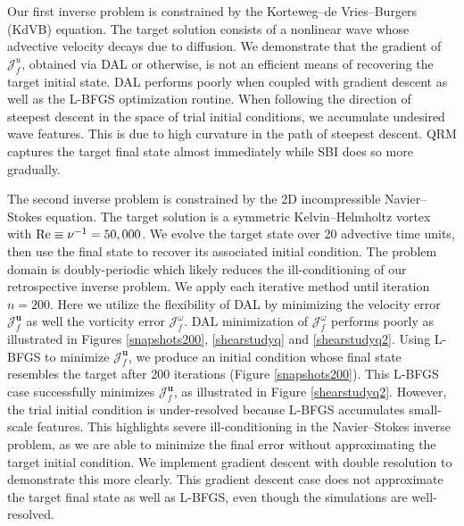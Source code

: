 \documentclass[%
 reprint,
 amsmath,amssymb,
 aps,
 pre,
]{revtex4-2}
\renewcommand{\vec}[1]{\boldsymbol{#1}}
\newcommand{\J}{\mathcal{J}}
\newcommand{\Juo}{\mathcal{J}^{u}_0}
\newcommand{\JUf}{\mathcal{J}^{\vec{u}}_f}
\newcommand{\Jwf}{\mathcal{J}^{\omega}_f}
\begin{document}
Our first inverse problem is constrained by the Korteweg--de Vries--Burgers (KdVB) equation.
The target solution consists of a nonlinear wave whose advective velocity decays due to diffusion.
We demonstrate that the gradient of $\J^u_f$, obtained via DAL or otherwise, is not an efficient means of recovering the target initial state.
DAL performs poorly when coupled with gradient descent as well as the L-BFGS optimization routine.
When following the direction of steepest descent in the space of trial initial conditions, we accumulate undesired wave features.
This is due to high curvature in the path of steepest descent.
QRM captures the target final state almost immediately while SBI does so more gradually.

The second inverse problem is constrained by the 2D incompressible Navier--Stokes equation.
The target solution is a symmetric Kelvin--Helmholtz vortex with $\rm{Re}\equiv\nu^{-1}=50,000$.
We evolve the target state over 20 advective time units, then use the final state to recover its associated initial condition.
The problem domain is doubly-periodic which likely reduces the ill-conditioning of our retrospective inverse problem.
We apply each iterative method until iteration $n=200$.
Here we utilize the flexibility of DAL by minimizing the velocity error $\JUf$ as well the vorticity error $\Jwf$.
DAL minimization of $\Jwf$ performs poorly as illustrated in Figures \ref{snapshots200}, \ref{shearstudyq} and \ref{shearstudyq2}.
Using L-BFGS to minimize $\JUf$, we produce an initial condition whose final state resembles the target after 200 iterations (Figure \ref{snapshots200}).
This L-BFGS case successfully minimizes $\JUf$, as illustrated in Figure \ref{shearstudyq2}.
However, the trial initial condition is under-resolved because L-BFGS accumulates small-scale features.
This highlights severe ill-conditioning in the Navier--Stokes inverse problem, as we are able to minimize the final error without approximating the target initial condition.
We implement gradient descent with double resolution to demonstrate this more clearly.
This gradient descent case does not approximate the target final state as well as L-BFGS, even though the simulations are well-resolved.
\end{document}
